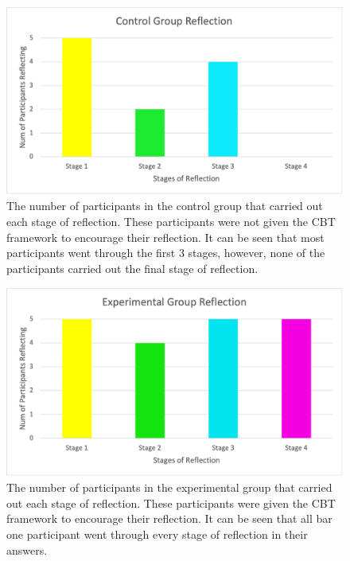 \documentclass{l4proj}
\begin{document}
\begin{figure}[H]
    \begin{centering}
    \includegraphics[scale=0.75]{images/ABControlGraph.png}
    \caption{The number of participants in the control group that carried out each stage of reflection. These participants were not given the CBT framework to encourage their reflection. It can be seen that most participants went through the first 3 stages, however, none of the participants carried out the final stage of reflection.}
    \label{fig: ABStudyGraphControl}
    \end{centering}
\end{figure}

\begin{figure}[H]
    \begin{centering}
    \includegraphics[scale=0.75]{images/ABExperimentGraph.png}
    \caption{The number of participants in the experimental group that carried out each stage of reflection. These participants were given the CBT framework to encourage their reflection. It can be seen that all bar one participant went through every stage of reflection in their answers.}
    \label{fig: ABStudyGraphExperiment}
    \end{centering}
\end{figure}
\end{document}
